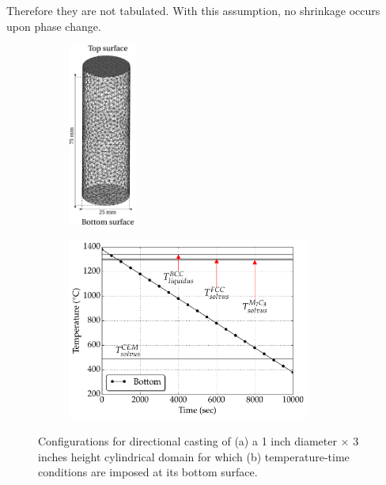 Therefore they are not tabulated. With this assumption, no shrinkage occurs upon phase change.
%
\begin{figure}[htbp]
\centering
  \begin{subfigure}[t]{0.3\textwidth}
    \centering
	\includegraphics[height=6cm]{Chapter2/Graphics/multicomponent/geo_bc/Cylinder_nocolor_annotate.pdf}
	\caption{}
    \label{fig:mutlicomponent_geo}
  \end{subfigure}
   \hspace{1mm}%
   \begin{subfigure}[t]{0.5\textwidth}
    \centering
	\includegraphics[height=6cm]{Chapter2/Graphics/multicomponent/geo_bc/BC.pdf}
	\caption{}
    \label{fig:mutlicomponent_bc}
  \end{subfigure}
\caption{Configurations for directional casting of (a) a 1 inch diameter $\times$ 3 inches height cylindrical domain for which
(b) temperature-time conditions are imposed at its bottom surface.} 
\label{fig:mutlicomponent_geobc}
\end{figure}
%
%
